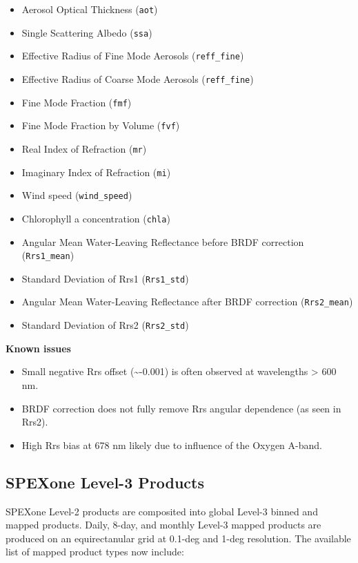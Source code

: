 \documentclass[
  11pt,
  letterpaper,
]{scrreprt}
\providecommand{\tightlist}{%
  \setlength{\itemsep}{0pt}\setlength{\parskip}{0pt}}
\begin{document}
\begin{itemize}
\tightlist
\item
  Aerosol Optical Thickness (\texttt{aot})
\item
  Single Scattering Albedo (\texttt{ssa})
\item
  Effective Radius of Fine Mode Aerosols (\texttt{reff\_fine})
\item
  Effective Radius of Coarse Mode Aerosols (\texttt{reff\_fine})
\item
  Fine Mode Fraction (\texttt{fmf})
\item
  Fine Mode Fraction by Volume (\texttt{fvf})
\item
  Real Index of Refraction (\texttt{mr})
\item
  Imaginary Index of Refraction (\texttt{mi})
\item
  Wind speed (\texttt{wind\_speed})
\item
  Chlorophyll a concentration (\texttt{chla})
\item
  Angular Mean Water-Leaving Reflectance before BRDF correction
  (\texttt{Rrs1\_mean})
\item
  Standard Deviation of Rrs1 (\texttt{Rrs1\_std})
\item
  Angular Mean Water-Leaving Reflectance after BRDF correction
  (\texttt{Rrs2\_mean})
\item
  Standard Deviation of Rrs2 (\texttt{Rrs2\_std})
\end{itemize}

\textbf{Known issues}

\begin{itemize}
\tightlist
\item
  Small negative Rrs offset (\textasciitilde-0.001) is often observed at
  wavelengths \textgreater{} 600 nm.
\item
  BRDF correction does not fully remove Rrs angular dependence (as seen
  in Rrs2).
\item
  High Rrs bias at 678 nm likely due to influence of the Oxygen A-band.
\end{itemize}

\subsection*{SPEXone Level-3 Products}\label{spexone-level-3-products-1}

SPEXone Level-2 products are composited into global Level-3 binned and
mapped products. Daily, 8-day, and monthly Level-3 mapped products are
produced on an equirectanular grid at 0.1-deg and 1-deg resolution. The
available list of mapped product types now include:
\end{document}
